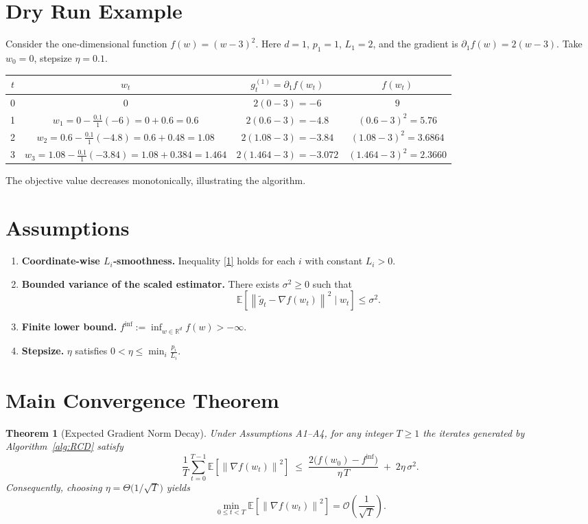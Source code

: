 \documentclass{article}
\newtheorem{theorem}{Theorem}
\newcommand{\E}{\mathbb{E}}
\newcommand{\R}{\mathbb{R}}
\newcommand{\norm}[1]{\left\lVert#1\right\rVert}
\begin{document}
\section*{Dry Run Example}
Consider the one‑dimensional function $f(w)=(w-3)^2$.
Here $d=1$, $p_1=1$, $L_1=2$, and the gradient is $\partial_1 f(w)=2(w-3)$.
Take $w_0=0$, stepsize $\eta=0.1$.

\begin{tabular}{c|c|c|c}
$t$ & $w_t$ & $g_t^{(1)}=\partial_1 f(w_t)$ & $f(w_t)$\\\hline
0 & $0$ & $2(0-3)=-6$ & $9$\\
1 & $w_1 = 0-\frac{0.1}{1}(-6)=0+0.6=0.6$ & $2(0.6-3)=-4.8$ & $(0.6-3)^2=5.76$\\
2 & $w_2 = 0.6-\frac{0.1}{1}(-4.8)=0.6+0.48=1.08$ & $2(1.08-3)=-3.84$ & $(1.08-3)^2=3.6864$\\
3 & $w_3 = 1.08-\frac{0.1}{1}(-3.84)=1.08+0.384=1.464$ & $2(1.464-3)=-3.072$ & $(1.464-3)^2=2.3660$
\end{tabular}

The objective value decreases monotonically, illustrating the algorithm.

\newpage
\section*{Assumptions}
\begin{enumerate}[label=\textbf{A\arabic*.}, leftmargin=*]
\item \textbf{Coordinate-wise $L_i$‑smoothness.}  Inequality \eqref{1} holds for each $i$ with constant $L_i>0$.
\item \textbf{Bounded variance of the scaled estimator.} There exists $\sigma^2\ge0$ such that
\[
\E\!\left[\norm{\tilde g_t-\nabla f(w_t)}^{2}\mid w_t\right]\le\sigma^{2}.
\tag{5}
\]
\item \textbf{Finite lower bound.} $f^{\inf}:=\inf_{w\in\R^{d}}f(w)>-\infty$.
\item \textbf{Stepsize.} $\eta$ satisfies $0<\eta\le \min_{i}\frac{p_i}{L_i}$.
\end{enumerate}

\section*{Main Convergence Theorem}
\begin{theorem}[Expected Gradient Norm Decay]\label{thm:main}
Under Assumptions A1–A4, for any integer $T\ge1$ the iterates generated by Algorithm~\ref{alg:RCD} satisfy
\[
\frac{1}{T}\sum_{t=0}^{T-1}\E\!\left[\norm{\nabla f(w_t)}^{2}\right]
\;\le\;
\frac{2\bigl(f(w_0)-f^{\inf}\bigr)}{\eta\,T}
\;+\;
2\eta\,\sigma^{2}.
\tag{6}
\]
Consequently, choosing $\eta = \Theta\!\bigl(1/\sqrt{T}\bigr)$ yields
\[
\min_{0\le t<T}\E\!\left[\norm{\nabla f(w_t)}^{2}\right]=\mathcal{O}\!\left(\frac{1}{\sqrt{T}}\right).
\]
\end{theorem}
\end{document}
